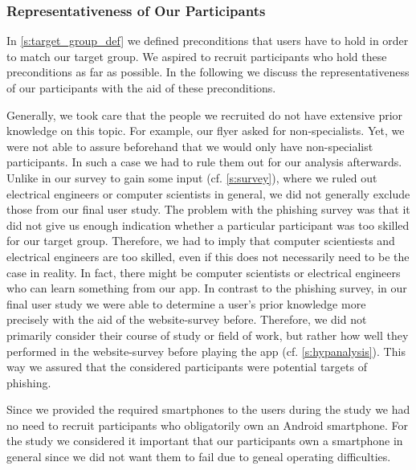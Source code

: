 \subsubsection{Representativeness of Our Participants}
\label{s:representativeness}
In \autoref{s:target_group_def} we defined preconditions that users have to hold in order to match our target group.
We aspired to recruit participants who hold these preconditions as far as possible.
In the following we discuss the representativeness of our participants with the aid of these preconditions.

\begin{description}[leftmargin=0cm]
	\item[Attackability:] Generally, we took care that the people we recruited do not have extensive prior knowledge on this topic.
For example, our flyer asked for non-specialists.
Yet, we were not able to assure beforehand that we would only have non-specialist participants.
In such a case we had to rule them out for our analysis afterwards.
Unlike in our survey to gain some input (cf. \autoref{s:survey}), where we ruled out electrical engineers or computer scientists in general, we did not generally exclude those from our final user study.
The problem with the phishing survey was that it did not give us enough indication whether a particular participant was too skilled for our target group.
Therefore, we had to imply that computer scientiests and electrical engineers are too skilled, even if this does not necessarily need to be the case in reality.
In fact, there might be computer scientists or electrical engineers who can learn something from our app.
In contrast to the phishing survey, in our final user study we were able to determine a user's prior knowledge more precisely with the aid of the website-survey before.
Therefore, we did not primarily consider their course of study or field of work, but rather how well they performed in the website-survey before playing the app (cf. \autoref{s:hypanalysis}).
This way we assured that the considered participants were potential targets of phishing.
	\item[Android Users:] Since we provided the required smartphones to the users during the study we had no need to recruit participants who obligatorily own an Android smartphone.
For the study we considered it important that our participants own a smartphone in general since we did not want them to fail due to geneal operating difficulties.

\end{description}
